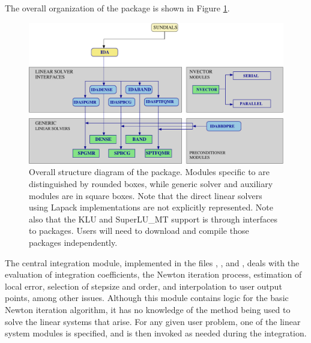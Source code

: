 The overall organization of the {\ida} package is shown in Figure
\ref{f:idaorg}.
\begin{figure}
{\centerline{\includegraphics[width=\textwidth]{idaorg}}}
\caption [Overall structure diagram of the {\ida} package]
{Overall structure diagram of the {\ida} package.
  Modules specific to {\ida} are distinguished by rounded boxes, while 
  generic solver and auxiliary modules are in square boxes.
  Note that the direct linear solvers using Lapack implementations are not 
  explicitly represented.
  Note also that the KLU and SuperLU\_MT support 
  is through interfaces
  to packages.  Users will need to download and compile those packages independently.}
\label{f:idaorg}
\end{figure}
The central integration module, implemented in the files ,
, and , deals with the evaluation of integration 
coefficients, the Newton iteration process, estimation of local error,
selection of stepsize and order, and interpolation to user output
points, among other issues.  Although this module contains logic for
the basic Newton iteration algorithm, it has no knowledge of the
method being used to solve the linear systems that arise.  For any
given user problem, one of the linear system modules is specified, and
is then invoked as needed during the integration. 

